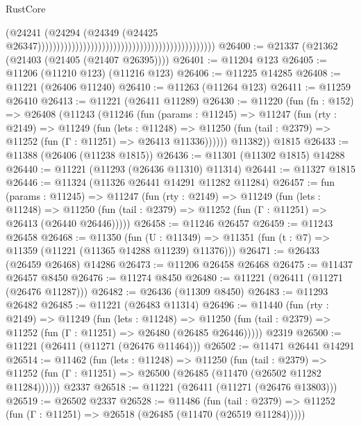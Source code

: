 \begin{lexlean}{RustCore}
\begin{coremodule}
                                                                                          (@24241
                                                                                            (@24294
                                                                                              (@24349
                                                                                                (@24425
                                                                                                  @26347)))))))))))))))))))))))))))))))))))))))))))))))
@26400 := @21337 (@21362 (@21403 (@21405 (@21407 @26395))))
@26401 := @11204 @123
@26405 := @11206 (@11210 @123) (@11216 @123)
@26406 := @11225 @14285
@26408 := @11221 (@26406 @11240)
@26410 := @11263 (@11264 @123)
@26411 := @11259 @26410
@26413 := @11221 (@26411 @11289)
@26430 := @11220
    (fun (fn : @152) =>
    @26408
      (@11243
        (@11246
          (fun (params : @11245) =>
          @11247
            (fun (rty : @2149) =>
            @11249
              (fun (lets : @11248) =>
              @11250 (fun (tail : @2379) => @11252 (fun (Γ : @11251) => @26413 @11336))))))
        @11382))
    @1815
@26433 := @11388 (@26406 (@11238 @1815))
@26436 := @11301 (@11302 @1815) @14288
@26440 := @11221 (@11293 (@26436 @11310) @11314)
@26441 := @11327 @1815
@26446 := @11324 (@11326 @26441 @14291 @11282 @11284)
@26457 := fun (params : @11245) =>
  @11247
    (fun (rty : @2149) =>
    @11249
      (fun (lets : @11248) =>
      @11250 (fun (tail : @2379) => @11252 (fun (Γ : @11251) => @26413 (@26440 @26446)))))
@26458 := @11246 @26457
@26459 := @11243 @26458
@26468 := @11350
    (fun (U : @11349) => @11351 (fun (t : @7) => @11359 (@11221 (@11365 @14288 @11239) @11376)))
@26471 := @26433 (@26459 @26468) @14286
@26473 := @11206 @26458 @26468
@26475 := @11437 @26457 @8450
@26476 := @11274 @8450
@26480 := @11221 (@26411 (@11271 (@26476 @11287)))
@26482 := @26436 (@11309 @8450)
@26483 := @11293 @26482
@26485 := @11221 (@26483 @11314)
@26496 := @11440
    (fun (rty : @2149) =>
    @11249
      (fun (lets : @11248) =>
      @11250 (fun (tail : @2379) => @11252 (fun (Γ : @11251) => @26480 (@26485 @26446)))))
    @2319
@26500 := @11221 (@26411 (@11271 (@26476 @11464)))
@26502 := @11471 @26441 @14291
@26514 := @11462
    (fun (lets : @11248) =>
    @11250
      (fun (tail : @2379) =>
      @11252 (fun (Γ : @11251) => @26500 (@26485 (@11470 (@26502 @11282 @11284))))))
    @2337
@26518 := @11221 (@26411 (@11271 (@26476 @13803)))
@26519 := @26502 @2337
@26528 := @11486
    (fun (tail : @2379) => @11252 (fun (Γ : @11251) => @26518 (@26485 (@11470 (@26519 @11284)))))

\end{coremodule}
\end{lexlean}
